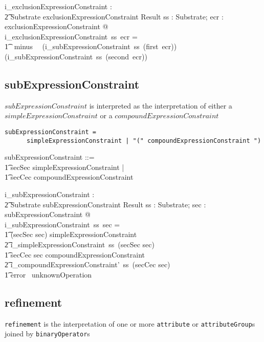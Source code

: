 \documentclass{article}
\def\spec#1{{\tt #1}}
\begin{document}
\begin{gendef}
    i\_exclusionExpressionConstraint : \\
\t2 Substrate \pfun exclusionExpressionConstraint \pfun Result
\where
   \forall ss : Substrate; ecr : exclusionExpressionConstraint @ \\
i\_exclusionExpressionConstraint~ss~ecr = \\
\t1~ minus~~ (i\_subExpressionConstraint~ss~(first~ecr))~ (i\_subExpressionConstraint~ss~(second~ecr))
\end{gendef}

\subsection{subExpressionConstraint}
$subExpressionConstraint$ is interpreted as the interpretation of either a $simpleExpressionConstraint$
or a $compoundExpressionConstraint$
\begin{verbatim}
subExpressionConstraint =
      simpleExpressionConstraint | "(" compoundExpressionConstraint ")
\end{verbatim}

\begin{zed}
subExpressionConstraint ::= \\
\t1 secSec \ldata simpleExpressionConstraint \rdata | \\
\t1 secCec \ldata compoundExpressionConstraint \rdata
\end{zed}

\begin{gendef}
   i\_subExpressionConstraint : \\
\t2 Substrate \pfun subExpressionConstraint \pfun Result
\where
   \forall ss : Substrate; sec : subExpressionConstraint @ \\
i\_subExpressionConstraint~ss~sec = \\
\t1 \IF (secSec \inv sec) \in simpleExpressionConstraint \\
\t2 \THEN i\_simpleExpressionConstraint~ss~(secSec \inv sec) \\
 \t1 \ELSE \IF secCec \inv sec \in compoundExpressionConstraint \\
\t2 \THEN i\_compoundExpressionConstraint'~ss~(secCec \inv sec) \\
\t1 \ELSE error~ unknownOperation
\end{gendef}


\subsection{refinement}
\spec{refinement} is the interpretation of one or more \spec{attribute} or \spec{attributeGroup}s joined
by \spec{binaryOperator}s
\end{document}
